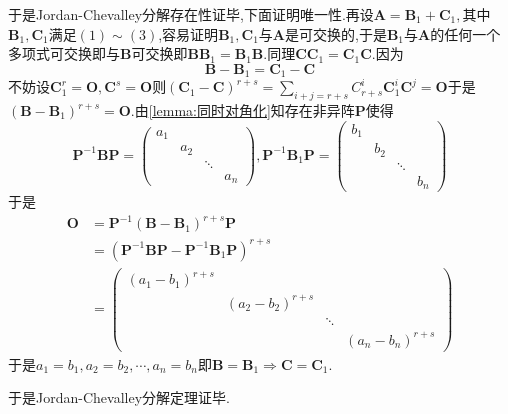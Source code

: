 \begin{formal}
\begin{Proof}
    于是Jordan-Chevalley分解存在性证毕,下面证明唯一性.再设$\bm{A}=\bm{B}_1+\bm{C}_1,$其中$\bm{B}_1,\bm{C}_1$满足$(1)\sim (3)$,容易证明$\bm{B}_1,\bm{C}_1$与$\bm{A}$是可交换的,于是$\bm{B}_1$与$\bm{A}$的任何一个多项式可交换即与$\bm{B}$可交换即$\bm{BB}_1=\bm{B}_1\bm{B}$.同理$\bm{CC}_1=\bm{C}_1\bm{C}$.因为\[
    \bm{B}-\bm{B}_1=\bm{C}_1-\bm{C}
    \]不妨设$\bm{C}_1^r=\bm{O},\bm{C}^s=\bm{O}$则$\displaystyle \left(\bm{C}_1-\bm{C}\right)^{r+s}=\sum_{i+j=r+s}C_{r+s}^i\bm{C}_1^i\bm{C}^j=\bm{O}$于是$\left(
        \bm{B}-\bm{B}_1
    \right)^{r+s}=\bm{O}$.由\cref{lemma:同时对角化}知存在非异阵$\bm{P}$使得\[
    \bm{P}^{-1}\bm{BP}=\begin{pmatrix}
        a_1&&&\\
        &a_2&&\\
        &&\ddots&\\
        &&&a_n
    \end{pmatrix},\bm{P}^{-1}\bm{B}_1\bm{P}=\begin{pmatrix}
        b_1&&&\\
        &b_2&&\\
        &&\ddots&\\
        &&&b_n
    \end{pmatrix}
    \]于是\begin{align*}
    \bm{O}&=\bm{P}^{-1}\left(\bm{B}-\bm{B}_1\right)^{r+s}\bm{P}\\
    &=\left(
        \bm{P}^{-1}\bm{B}\bm{P}-\bm{P}^{-1}\bm{B}_1\bm{P}
    \right)^{r+s}\\
    &=\begin{pmatrix}
        \left(a_1-b_1\right)^{r+s}&&&\\
        &\left(a_2-b_2\right)^{r+s}&&\\
        &&\ddots&\\
        &&&\left(a_n-b_n\right)^{r+s}
    \end{pmatrix}
\end{align*}于是$a_1=b_1,a_2=b_2,\cdots,a_n=b_n$即$\bm{B}=\bm{B}_1\Longrightarrow \bm{C}=\bm{C}_1$.

    于是Jordan-Chevalley分解定理证毕.
\end{Proof}
\end{formal}
